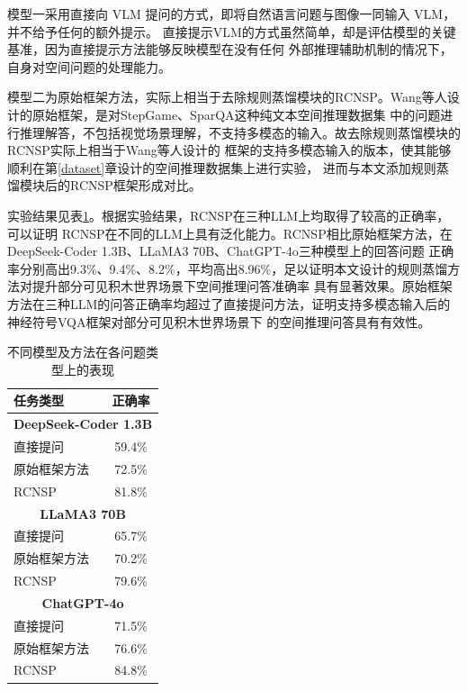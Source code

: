 模型一采用直接向 VLM 提问的方式，即将自然语言问题与图像一同输入 VLM，并不给予任何的额外提示。
直接提示VLM的方式虽然简单，却是评估模型的关键基准，因为直接提示方法能够反映模型在没有任何
外部推理辅助机制的情况下，自身对空间问题的处理能力。

模型二为原始框架方法，实际上相当于去除规则蒸馏模块的RCNSP。Wang等人设计的原始框架，是对StepGame、SparQA这种纯文本空间推理数据集
中的问题进行推理解答，不包括视觉场景理解，不支持多模态的输入。故去除规则蒸馏模块的RCNSP实际上相当于Wang等人设计的
框架的支持多模态输入的版本，使其能够顺利在第\ref{dataset}章设计的空间推理数据集上进行实验，
进而与本文添加规则蒸馏模块后的RCNSP框架形成对比。

实验结果见表\ref{tab:overall_comparison}。根据实验结果，RCNSP在三种LLM上均取得了较高的正确率，可以证明
RCNSP在不同的LLM上具有泛化能力。RCNSP相比原始框架方法，在DeepSeek-Coder 1.3B、LLaMA3 70B、ChatGPT-4o三种模型上的回答问题
正确率分别高出9.3\%、9.4\%、8.2\%，平均高出8.96\%，足以证明本文设计的规则蒸馏方法对提升部分可见积木世界场景下空间推理问答准确率
具有显著效果。原始框架方法在三种LLM的问答正确率均超过了直接提问方法，证明支持多模态输入后的神经符号VQA框架对部分可见积木世界场景下
的空间推理问答具有有效性。
\begin{table}[h]
    \centering
    \begin{tabular}{lc}
        \toprule
        \textbf{任务类型} & \textbf{正确率} \\
        \midrule
        \multicolumn{2}{c}{\textbf{DeepSeek-Coder 1.3B}} \\
        直接提问 & 59.4\% \\
        原始框架方法 & 72.5\% \\
        RCNSP & 81.8\% \\
        \midrule
        \multicolumn{2}{c}{\textbf{LLaMA3 70B}} \\
        直接提问 & 65.7\% \\
        原始框架方法 & 70.2\% \\
        RCNSP & 79.6\% \\
        \midrule
        \multicolumn{2}{c}{\textbf{ChatGPT-4o}} \\
        直接提问 & 71.5\% \\
        原始框架方法 & 76.6\% \\
        RCNSP & 84.8\% \\
        \bottomrule
    \end{tabular}
    \caption{不同模型及方法在各问题类型上的表现}
    \label{tab:overall_comparison}
\end{table}
